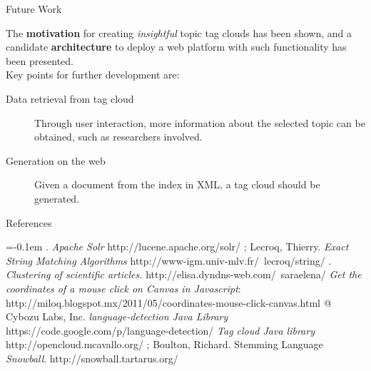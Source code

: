 \documentclass[a0paper, portrait]{baposter}
\begin{document}
\begin{poster}
  
  \begin{posterbox}[column=2, name=future, below=interact] {Future Work} {
    The {\bf motivation} for creating {\em insightful} topic tag clouds has been shown, and a candidate {\bf architecture} to deploy a web platform with such functionality has been presented.  \\ %
    Key points for further development are:
    \begin{description}
      \item[Data retrieval from tag cloud] Through user interaction, more information about the selected topic can be obtained, such as researchers involved.
      \item[Generation on the web] Given a document from the index in XML, a tag cloud should be generated.
    \end{description}
  }
  \end{posterbox}
  
  \begin{posterbox}[column=2, name=ref, below=future] {References} {
      \small {
      \begin{flushleft}
        
        \renewcommand{\section}[2]{\vskip 0.05em}
        \begin{thebibliography}{7}\itemsep=-0.1em 
          \setlength{\baselineskip}{0.4em}
            . {\it Apache Solr} 
            \newblock http://lucene.apache.org/solr/  
            ; {\sc Lecroq, Thierry}. {\it Exact String Matching Algorithms}  
            \newblock http://www-igm.univ-mlv.fr/~lecroq/string/      
            . {\it Clustering of scientific articles.} 
            \newblock http://elisa.dyndns-web.com/~saraelena/
             {\it Get the coordinates of a mouse click on Canvas in Javascript}:
            \newblock http://miloq.blogspot.mx/2011/05/coordinates-mouse-click-canvas.html
             @ Cybozu Labs, Inc. {\it language-detection Java Library} 
            \newblock https://code.google.com/p/language-detection/
             {\it Tag cloud Java library} 
            \newblock http://opencloud.mcavallo.org/ 
            ; {\sc Boulton, Richard}. Stemming Language {\em Snowball}. 
            \newblock http://snowball.tartarus.org/
        \end{thebibliography}
        \vspace{0.3em}       
      \end{flushleft}
      }
    }
  \end{posterbox}


\end{poster}
\end{document}
